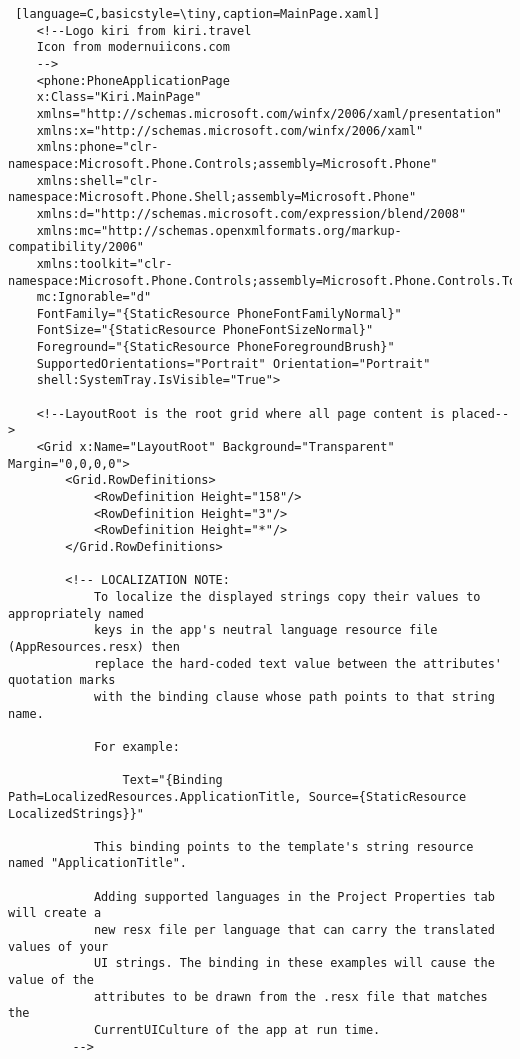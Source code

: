 \begin{lstlisting} [language=C,basicstyle=\tiny,caption=MainPage.xaml]
	<!--Logo kiri from kiri.travel 
    Icon from modernuiicons.com
    -->
    <phone:PhoneApplicationPage
    x:Class="Kiri.MainPage"
    xmlns="http://schemas.microsoft.com/winfx/2006/xaml/presentation"
    xmlns:x="http://schemas.microsoft.com/winfx/2006/xaml"
    xmlns:phone="clr-namespace:Microsoft.Phone.Controls;assembly=Microsoft.Phone"
    xmlns:shell="clr-namespace:Microsoft.Phone.Shell;assembly=Microsoft.Phone"
    xmlns:d="http://schemas.microsoft.com/expression/blend/2008"
    xmlns:mc="http://schemas.openxmlformats.org/markup-compatibility/2006"
    xmlns:toolkit="clr-namespace:Microsoft.Phone.Controls;assembly=Microsoft.Phone.Controls.Toolkit"
    mc:Ignorable="d"
    FontFamily="{StaticResource PhoneFontFamilyNormal}"
    FontSize="{StaticResource PhoneFontSizeNormal}"
    Foreground="{StaticResource PhoneForegroundBrush}"
    SupportedOrientations="Portrait" Orientation="Portrait"
    shell:SystemTray.IsVisible="True">

    <!--LayoutRoot is the root grid where all page content is placed-->
    <Grid x:Name="LayoutRoot" Background="Transparent" Margin="0,0,0,0">
        <Grid.RowDefinitions>
            <RowDefinition Height="158"/>
            <RowDefinition Height="3"/>
            <RowDefinition Height="*"/>
        </Grid.RowDefinitions>

        <!-- LOCALIZATION NOTE:
            To localize the displayed strings copy their values to appropriately named
            keys in the app's neutral language resource file (AppResources.resx) then
            replace the hard-coded text value between the attributes' quotation marks
            with the binding clause whose path points to that string name.

            For example:

                Text="{Binding Path=LocalizedResources.ApplicationTitle, Source={StaticResource LocalizedStrings}}"

            This binding points to the template's string resource named "ApplicationTitle".

            Adding supported languages in the Project Properties tab will create a
            new resx file per language that can carry the translated values of your
            UI strings. The binding in these examples will cause the value of the
            attributes to be drawn from the .resx file that matches the
            CurrentUICulture of the app at run time.
         -->


\end{lstlisting}
